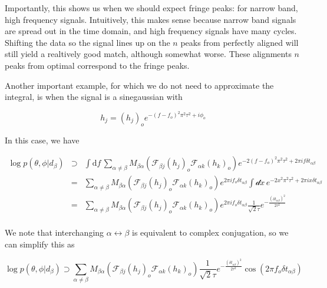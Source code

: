 \documentclass[10pt]{article}
\begin{document}
Importantly, this shows us when we should expect fringe peaks: for narrow band, high frequency signals. Intuitively, this makes sense because narrow band signals are spread out in the time domain, and high frequency signals have many cycles. Shifting the data so the signal lines up on the $n$ peaks from perfectly aligned will still yield a realtively good match, although somewhat worse. These alignments $n$ peaks from optimal correspond to the fringe peaks.

Another important example, for which we do not need to approximate the integral, is when the signal is a sinegaussian with

\begin{equation}
h_j = \left(h_j\right)_o e^{-(f-f_o)^2 \pi^2 \tau^2 + i\phi_o}
\end{equation}

In this case, we have

\begin{eqnarray}
\log p(\theta,\phi|d_\beta) & \supset & \int\mathrm{d}f\,\sum\limits_{\alpha\neq\beta} M_{\beta\alpha} \left(\mathcal{F}_{\beta j}\left(h_j\right)_o \mathcal{F}_{\alpha k}\left(h_k\right)_o \right)e^{-2(f-f_o)^2\pi^2\tau^2+2\pi i f \delta t_{\alpha\beta}} \\
& = & \sum\limits_{\alpha\neq\beta} M_{\beta\alpha} \left(\mathcal{F}_{\beta j}\left(h_j\right)_o \mathcal{F}_{\alpha k}\left(h_k\right)_o \right) e^{2\pi i f_o \delta t_{\alpha\beta}}\int\mathcal{d}x\, e^{-2x^2\pi^2\tau^2+2\pi i x \delta t_{\alpha\beta}} \\
& = & \sum\limits_{\alpha\neq\beta} M_{\beta\alpha} \left(\mathcal{F}_{\beta j}\left(h_j\right)_o \mathcal{F}_{\alpha k}\left(h_k\right)_o \right) e^{2\pi i f_o \delta t_{\alpha\beta}}\frac{1}{\sqrt{2}\tau} e^{-\frac{(\delta t_{\alpha\beta})^2}{2\tau^2}} \\
\end{eqnarray}

We note that interchanging $\alpha\leftrightarrow\beta$ is equivalent to complex conjugation, so we can simplify this as

\begin{equation}
\log p(\theta,\phi|d_\beta) \supset \sum\limits_{\alpha\neq\beta} M_{\beta\alpha} \left(\mathcal{F}_{\beta j}\left(h_j\right)_o \mathcal{F}_{\alpha k}\left(h_k\right)_o \right) \frac{1}{\sqrt{2}\tau} e^{-\frac{(\delta t_{\alpha\beta})^2}{2\tau^2}} \cos\left( 2\pi f_o \delta t_{\alpha\beta} \right)
\end{equation}
\end{document}
